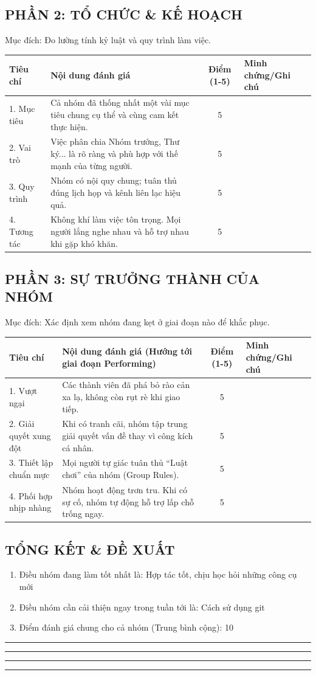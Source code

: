 \documentclass{article}
\begin{document}
\subsection{PHẦN 2: TỔ CHỨC \& KẾ HOẠCH}
\noindent Mục đích: Đo lường tính kỷ luật và quy trình làm việc.

\begin{tabularx}{\textwidth}{|l|X|c|X|}
\hline
\textbf{Tiêu chí} & \textbf{Nội dung đánh giá} & \textbf{Điểm (1-5)} & \textbf{Minh chứng/Ghi chú} \\ \hline
1. Mục tiêu & Cả nhóm đã thống nhất một vài mục tiêu chung cụ thể và cùng cam kết thực hiện. & 5 & \\ \hline
2. Vai trò & Việc phân chia Nhóm trưởng, Thư ký... là rõ ràng và phù hợp với thế mạnh của từng người. & 5 & \\ \hline
3. Quy trình & Nhóm có nội quy chung; tuân thủ đúng lịch họp và kênh liên lạc hiệu quả. & 5 & \\ \hline
4. Tương tác & Không khí làm việc tôn trọng. Mọi người lắng nghe nhau và hỗ trợ nhau khi gặp khó khăn. & 5 & \\ \hline
\end{tabularx}

\subsection{PHẦN 3: SỰ TRƯỞNG THÀNH CỦA NHÓM}
\noindent Mục đích: Xác định xem nhóm đang kẹt ở giai đoạn nào để khắc phục.

\begin{tabularx}{\textwidth}{|l|X|c|X|}
\hline
\textbf{Tiêu chí} & \textbf{Nội dung đánh giá (Hướng tới giai đoạn Performing)} & \textbf{Điểm (1-5)} & \textbf{Minh chứng/Ghi chú} \\ \hline
1. Vượt ngại & Các thành viên đã phá bỏ rào cản xa lạ, không còn rụt rè khi giao tiếp. & 5 & \\ \hline
2. Giải quyết xung đột & Khi có tranh cãi, nhóm tập trung giải quyết vấn đề thay vì công kích cá nhân. & 5 & \\ \hline
3. Thiết lập chuẩn mực & Mọi người tự giác tuân thủ ``Luật chơi'' của nhóm (Group Rules). & 5 & \\ \hline
4. Phối hợp nhịp nhàng & Nhóm hoạt động trơn tru. Khi có sự cố, nhóm tự động hỗ trợ lấp chỗ trống ngay. & 5 & \\ \hline
\end{tabularx}

\subsection{TỔNG KẾT \& ĐỀ XUẤT}
\begin{enumerate}
\item Điều nhóm đang làm tốt nhất là: Hợp tác tốt, chịu học hỏi những công cụ mới
\item Điều nhóm cần cải thiện ngay trong tuần tới là: Cách sử dụng git
\item Điểm đánh giá chung cho cả nhóm (Trung bình cộng): 10
\end{enumerate}


\vspace{1cm}
\hrule

\vspace{1cm}
\hrule

\vspace{1cm}
\hrule

\vspace{1cm}
\hrule

\end{document}
